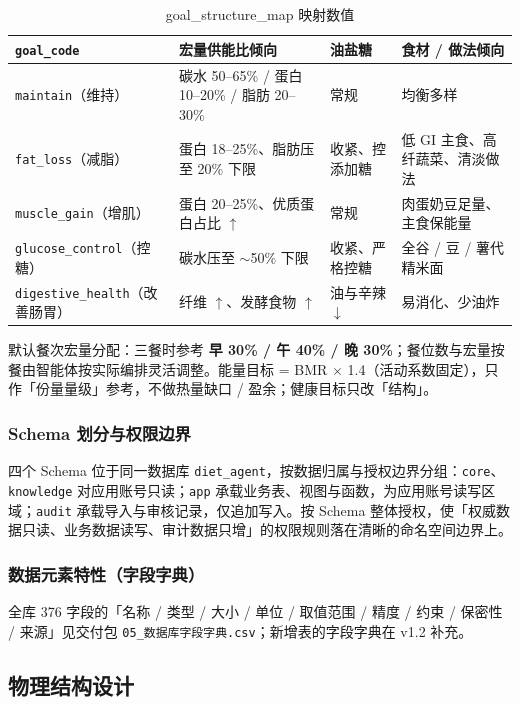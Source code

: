 \documentclass[12pt,a4paper]{ctexart}
\begin{document}
\begin{xltabular}{\linewidth}{P{3.4cm}Q{5cm}Q{2.2cm}L}
\caption{goal\_structure\_map 映射数值} \\
\toprule
\textbf{\texttt{goal\_code}} & \textbf{宏量供能比倾向} & \textbf{油盐糖} & \textbf{食材 / 做法倾向} \\
\midrule
\endhead
\texttt{maintain}（维持） & 碳水 50--65\% / 蛋白 10--20\% / 脂肪 20--30\% & 常规 & 均衡多样 \\
\texttt{fat\_loss}（减脂） & 蛋白 18--25\%、脂肪压至 20\% 下限 & 收紧、控添加糖 & 低 GI 主食、高纤蔬菜、清淡做法 \\
\texttt{muscle\_gain}\newline（增肌） & 蛋白 20--25\%、优质蛋白占比 $\uparrow$ & 常规 & 肉蛋奶豆足量、主食保能量 \\
\texttt{glucose\_control}（控糖） & 碳水压至 $\sim$50\% 下限 & 收紧、严格控糖 & 全谷 / 豆 / 薯代精米面 \\
\texttt{digestive\_health}（改善肠胃） & 纤维 $\uparrow$、发酵食物 $\uparrow$ & 油与辛辣 $\downarrow$ & 易消化、少油炸 \\
\bottomrule
\end{xltabular}

默认餐次宏量分配：三餐时参考 \textbf{早 30\% / 午 40\% / 晚 30\%}；餐位数与宏量按餐由智能体按实际编排灵活调整。能量目标 = BMR $\times$ 1.4（活动系数固定），只作「份量量级」参考，不做热量缺口 / 盈余；健康目标只改「结构」。

\subsubsection{Schema 划分与权限边界}

四个 Schema 位于同一数据库 \texttt{diet\_agent}，按数据归属与授权边界分组：\texttt{core}、\texttt{knowledge} 对应用账号只读；\texttt{app} 承载业务表、视图与函数，为应用账号读写区域；\texttt{audit} 承载导入与审核记录，仅追加写入。按 Schema 整体授权，使「权威数据只读、业务数据读写、审计数据只增」的权限规则落在清晰的命名空间边界上。

\subsubsection{数据元素特性（字段字典）}

全库 376 字段的「名称 / 类型 / 大小 / 单位 / 取值范围 / 精度 / 约束 / 保密性 / 来源」见交付包 \texttt{05\_数据库字段字典.csv}；新增表的字段字典在 v1.2 补充。

\subsection{物理结构设计}
\end{document}
